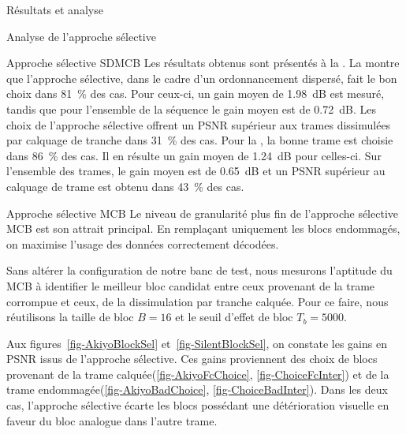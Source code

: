 \begin{chapter}{Résultats et analyse}
\begin{section}{Analyse de l'approche sélective}
\begin{subsection}{Approche sélective SDMCB}
Les résultats obtenus sont présentés à la . La
 montre que l'approche sélective, dans le cadre d'un
ordonnancement dispersé, fait le bon choix dans 81~\% des cas. Pour ceux-ci, un
gain moyen de 1.98~dB est mesuré, tandis que pour l'ensemble de la séquence le
gain moyen est de 0.72~dB. Les choix de l'approche sélective offrent un PSNR
supérieur aux trames dissimulées par calquage de tranche dans 31~\% des cas.
Pour la , la bonne trame est choisie dans 86~\%
des cas. Il en résulte un gain moyen de 1.24~dB pour celles-ci. Sur l'ensemble
des trames, le gain moyen est de 0.65~dB et un PSNR supérieur au calquage de
trame est obtenu dans 43~\% des cas.

\FloatBarrier
\end{subsection}
\begin{subsection}{Approche sélective MCB}
\label{sec-AnalyseMCB}
Le niveau de granularité plus fin de l’approche sélective MCB est son attrait
principal. En remplaçant uniquement les blocs endommagés, on maximise l’usage
des données correctement décodées.

Sans altérer la configuration de notre banc de test, nous mesurons l'aptitude du
MCB à identifier le meilleur bloc candidat entre ceux provenant de la trame
corrompue et ceux, de la dissimulation par tranche calquée. Pour ce faire, nous
réutilisons la taille de bloc $B=16$ et le seuil d'effet de bloc $T_b = 5000$.

Aux figures~\ref{fig-AkiyoBlockSel} et~\ref{fig-SilentBlockSel}, on constate
les gains en PSNR issus de l'approche sélective. Ces gains proviennent des
choix de blocs provenant de la trame calquée(\ref{fig-AkiyoFcChoice},
\ref{fig-ChoiceFcInter}) et de la trame endommagée(\ref{fig-AkiyoBadChoice},
\ref{fig-ChoiceBadInter}). Dans les deux cas, l'approche sélective écarte les
blocs possédant une détérioration visuelle en faveur du bloc analogue dans
l'autre trame.


\end{subsection}
\end{section}
\end{chapter}
